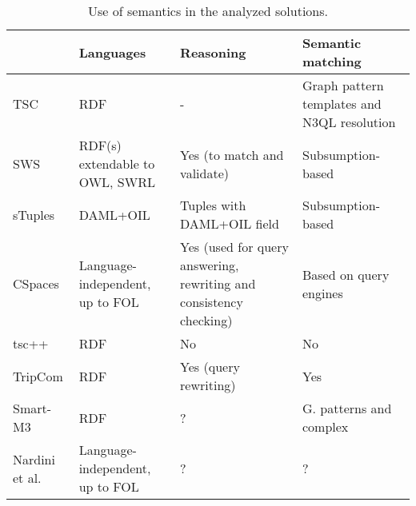 

\begin{table}[htbp]
\caption{Use of semantics in the analyzed solutions.}


\begin{tabular}{ l p{3cm} p{3cm} p{3cm} }
\hline 
  & Languages  & Reasoning  & Semantic matching \tabularnewline
\hline 
 TSC & RDF  & -  & Graph pattern templates and N3QL resolution \tabularnewline
 SWS & RDF(s) extendable to OWL, SWRL  & Yes (to match and validate)  & Subsumption-based \tabularnewline
 sTuples & DAML+OIL  & Tuples with DAML+OIL field  & Subsumption-based \tabularnewline
 CSpaces & Language-independent, up to FOL  & Yes (used for query answering, rewriting and consistency checking)  & Based on query engines \tabularnewline
 tsc++ & RDF & No  & No \tabularnewline %
 TripCom & RDF  & Yes (query rewriting) & Yes \tabularnewline %
 Smart-M3 & RDF  & ?  & G. patterns and complex \tabularnewline
 Nardini et al. & Language-independent, up to FOL & ?  & ? \tabularnewline
\hline 
\end{tabular}
\label{tab:comparisonSemantics}
\end{table}

